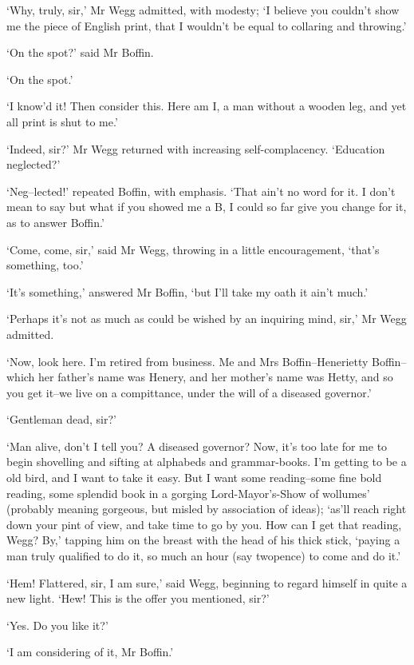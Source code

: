 ‘Why, truly, sir,’ Mr Wegg admitted, with modesty; ‘I believe you
couldn’t show me the piece of English print, that I wouldn’t be equal to
collaring and throwing.’

‘On the spot?’ said Mr Boffin.

‘On the spot.’

‘I know’d it! Then consider this. Here am I, a man without a wooden leg,
and yet all print is shut to me.’

‘Indeed, sir?’ Mr Wegg returned with increasing self-complacency.
‘Education neglected?’

‘Neg--lected!’ repeated Boffin, with emphasis. ‘That ain’t no word for
it. I don’t mean to say but what if you showed me a B, I could so far
give you change for it, as to answer Boffin.’

‘Come, come, sir,’ said Mr Wegg, throwing in a little encouragement,
‘that’s something, too.’

‘It’s something,’ answered Mr Boffin, ‘but I’ll take my oath it ain’t
much.’

‘Perhaps it’s not as much as could be wished by an inquiring mind, sir,’
Mr Wegg admitted.

‘Now, look here. I’m retired from business. Me and Mrs
Boffin--Henerietty Boffin--which her father’s name was Henery, and her
mother’s name was Hetty, and so you get it--we live on a compittance,
under the will of a diseased governor.’

‘Gentleman dead, sir?’

‘Man alive, don’t I tell you? A diseased governor? Now, it’s too late
for me to begin shovelling and sifting at alphabeds and grammar-books.
I’m getting to be a old bird, and I want to take it easy. But I want
some reading--some fine bold reading, some splendid book in a gorging
Lord-Mayor’s-Show of wollumes’ (probably meaning gorgeous, but misled
by association of ideas); ‘as’ll reach right down your pint of view, and
take time to go by you. How can I get that reading, Wegg? By,’ tapping
him on the breast with the head of his thick stick, ‘paying a man truly
qualified to do it, so much an hour (say twopence) to come and do it.’

‘Hem! Flattered, sir, I am sure,’ said Wegg, beginning to regard himself
in quite a new light. ‘Hew! This is the offer you mentioned, sir?’

‘Yes. Do you like it?’

‘I am considering of it, Mr Boffin.’

